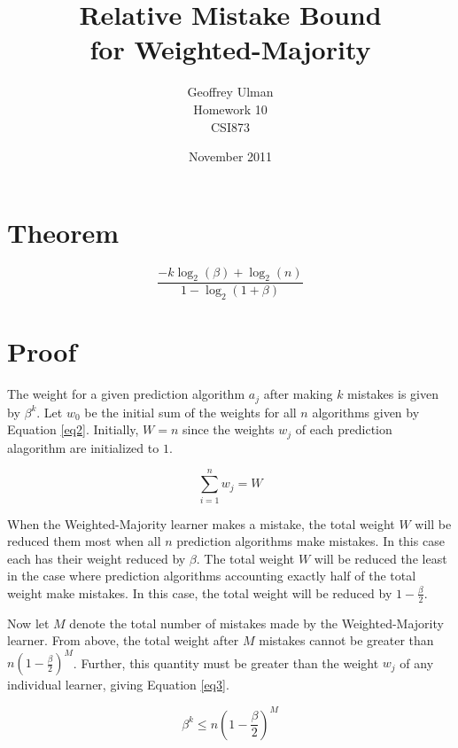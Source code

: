 \documentclass{article}
\begin{document}
\title{Relative Mistake Bound\\
       for Weighted-Majority}
\author{Geoffrey Ulman\\
        Homework 10\\
        CSI873}
\date{November 2011}
\maketitle

\section{Theorem}\label{Theorem}

\begin{equation}
\frac{-k \log _2 \left( \beta \right) + \log _2 \left( n \right)}{1 - \log _2 \left( 1 + \beta \right)}
\end{equation}

\section{Proof}\label{Proof}

The weight for a given prediction algorithm \(a_j\) after making \(k\) mistakes is given by \(\beta^k\). Let \(w_0\) be the initial sum of the weights for all \(n\) algorithms given by Equation \ref{eq2}. Initially, \(W=n\) since the weights \(w_j\) of each prediction alagorithm are initialized to \(1\).

\begin{equation}\label{eq2}
\sum_{i=1}^{n} w_{j} = W
\end{equation}

When the Weighted-Majority learner makes a mistake, the total weight \(W\) will be reduced them most when all \(n\) prediction algorithms make mistakes. In this case each has their weight reduced by \(\beta\). The total weight \(W\) will be reduced the least in the case where prediction algorithms accounting exactly half of the total weight make mistakes. In this case, the total weight will be reduced by \(1-\frac{\beta}{2} \).

Now let \(M\) denote the total number of mistakes made by the Weighted-Majority learner. From above, the total weight after \(M\) mistakes cannot be greater than \( n \left( 1-\frac{\beta}{2} \right) ^M \). Further, this quantity must be greater than the weight \(w_j\) of any individual learner, giving Equation \ref{eq3}.

\begin{equation}\label{eq3}
\beta^k \le n \left( 1-\frac{\beta}{2} \right) ^M
\end{equation}
\end{document}

